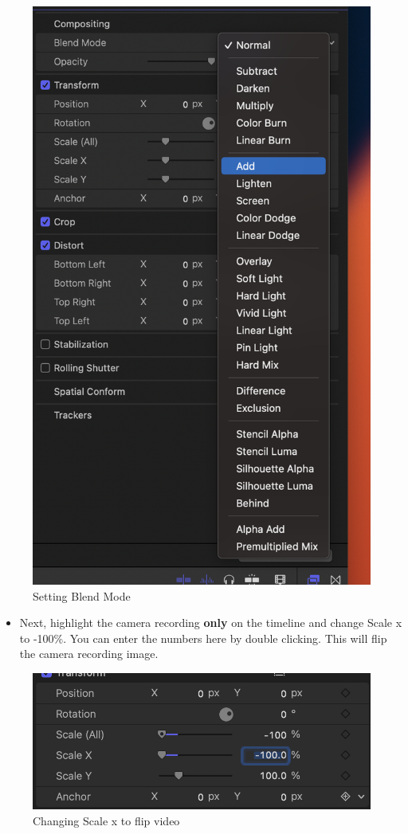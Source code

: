 \documentclass[
]{book}
\providecommand{\tightlist}{%
  \setlength{\itemsep}{0pt}\setlength{\parskip}{0pt}}
\begin{document}
\begin{figure}

{\centering \includegraphics[width=0.6\linewidth]{BlendMode} 

}

\caption{Setting Blend Mode}\label{fig:blend}
\end{figure}

\begin{itemize}
\tightlist
\item
  Next, highlight the camera recording \textbf{only} on the timeline and change Scale x to -100\%. You can enter the numbers here by double clicking. This will flip the camera recording image.
\end{itemize}

\begin{figure}

{\centering \includegraphics[width=1\linewidth]{ScaleX} 

}

\caption{Changing Scale x to flip video}\label{fig:scaleX}
\end{figure}
\end{document}
